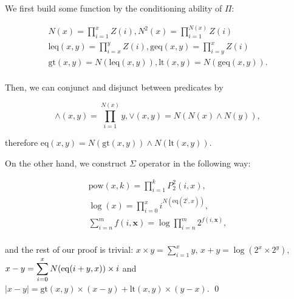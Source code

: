 
\begin{pf} \rm
  We first build some function by the conditioning ability of $\Pi$:

\[
 \begin{array}{c}
  \displaystyle N(x) = \prod_{i=1}^{x} Z(i), N^2(x) = \prod_{i=1}^{N(x)} Z(i) \\
  \displaystyle \mathrm{leq}(x, y) = \prod_{i = x}^y Z(i), 
  \displaystyle \mathrm{geq}(x, y) = \prod_{i = y}^x Z(i) \\
  \displaystyle \mathrm{gt}(x, y) = N(\mathrm{leq}(x, y)), 
  \displaystyle \mathrm{lt}(x, y) = N(\mathrm{geq}(x, y)). \\
 \end{array}
\]

  Then, we can conjunct and disjunct between predicates by

\[
  \mathrm{\land}(x, y) = \prod_{i = 1}^{N(x)} y, 
  \mathrm{\lor}(x, y) = N( N(x) \land N(y) ),
\]

\noindent therefore $\mathrm{eq}(x, y) = N(\mathrm{gt}(x, y)) \land N(\mathrm{lt}(x, y))$.

On the other hand,  we construct $\Sigma$ operator in the following way:

\[
 \begin{array}{c}
    \displaystyle \mathrm{pow}(x, k)  = \prod_{i = 1}^{k} P_2^2(i, x), \\
    \displaystyle \log (x) = \prod_{i = 0}^{x} i^{N(\mathrm{eq}(2^i, x))}, \\
    \displaystyle \sum_{i=n}^{m} f(i, \mathbf{x}) = \log \prod_{i=n}^{m} 2^{f(i, \mathbf{x})}, \\
 \end{array}
\]

\noindent and the rest of our proof is trivial:
  $\displaystyle x\times y = \sum_{i = 1}^x y$, 
  $\displaystyle x + y = \log \left( 2^{x} \times 2^y \right)$, 
  $\displaystyle x - y = \sum_{i = 0}^x N(\mathrm{eq}(i + y, x)) \times i$ and 
  $\displaystyle |x-y| = \mathrm{gt}(x, y) \times (x - y) + \mathrm{lt}(x, y) \times (y - x)$. \qed

\end{pf}

